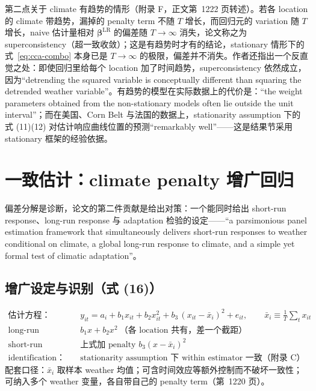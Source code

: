 第二点关于 climate 有趋势的情形（附录 F，正文第~1222 页转述）。若各 location 的 climate 带趋势，漏掉的 penalty term 不随 $T$ 增长，而回归元的 variation 随 $T$ 增长，naive 估计量相对 $\boldsymbol{\beta}^{\mathrm{LR}}$ 的偏差随 $T\to\infty$ 消失，论文称之为 superconsistency（超一致收敛）；这是有趋势时才有的结论，stationary 情形下的式~\ref{eq:cca-combo} 本身已是 $T\to\infty$ 的极限，偏差并不消失。作者还指出一个反直觉之处：即使回归里给每个 location 加了时间趋势，superconsistency 依然成立，因为``detrending the squared variable is conceptually different than squaring the detrended weather variable''\citep[第~1222 页]{merel2021climate}。有趋势的模型在实际数据上的代价是：``the weight parameters obtained from the non-stationary models often lie outside the unit interval''\citep[第~1222 页]{merel2021climate}；而在美国、Corn Belt 与法国的数据上，stationarity assumption 下的式 (11)(12) 对估计响应曲线位置的预测``remarkably well''\citep[第~1222 页]{merel2021climate}——这是结果节采用 stationary 框架的经验依据。

\section{一致估计：climate penalty 增广回归}
\label{sec:cca-augmented}

偏差分解是诊断，论文的第二件贡献是给出对策：一个能同时给出 short-run response、long-run response 与 adaptation 检验的设定——``a parsimonious panel estimation framework that simultaneously delivers short-run responses to weather conditional on climate, a global long-run response to climate, and a simple yet formal test of climatic adaptation''\citep[第~1210 页]{merel2021climate}。

\subsection{增广设定与识别（式 (16)）}

\begin{ident}
\begin{align*}
\text{估计方程：}\quad & y_{it} = a_i + b_1 x_{it} + b_2 x_{it}^2 + b_3\,(x_{it}-\bar{x}_i)^2 + e_{it},\qquad \bar{x}_i\equiv\tfrac{1}{T}\textstyle\sum_t x_{it} \\
\text{long-run response：}\quad & b_1 x + b_2 x^2\ \text{（各 location 共有，差一个截距）} \\
\text{short-run response：}\quad & \text{上式加 penalty } b_3(x-\bar{x}_i)^2 \\
\text{identification：}\quad & \text{stationarity assumption 下 within estimator 一致（附录 C）}
\end{align*}
配套口径：$\bar{x}_i$ 取样本 weather 均值；可含时间效应等额外控制而不破坏一致性；可纳入多个 weather 变量，各自带自己的 penalty term（第~1220 页）。
\end{ident}

